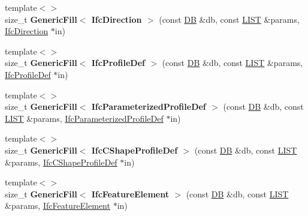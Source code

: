 \begin{DoxyCompactItemize}
\item 
\hypertarget{namespace_assimp_1_1_s_t_e_p_ac7d763d0df1d81a1e0e5924d529594d3}{{\footnotesize template$<$$>$ }\\size\+\_\+t {\bfseries Generic\+Fill$<$ Ifc\+Direction $>$} (const \hyperlink{class_assimp_1_1_s_t_e_p_1_1_d_b}{D\+B} \&db, const \hyperlink{class_assimp_1_1_s_t_e_p_1_1_e_x_p_r_e_s_s_1_1_l_i_s_t}{L\+I\+S\+T} \&params, \hyperlink{struct_assimp_1_1_i_f_c_1_1_ifc_direction}{Ifc\+Direction} $\ast$in)}\label{namespace_assimp_1_1_s_t_e_p_ac7d763d0df1d81a1e0e5924d529594d3}

\item 
\hypertarget{namespace_assimp_1_1_s_t_e_p_a959b997d69c3b7f9bb83d1ddb2758408}{{\footnotesize template$<$$>$ }\\size\+\_\+t {\bfseries Generic\+Fill$<$ Ifc\+Profile\+Def $>$} (const \hyperlink{class_assimp_1_1_s_t_e_p_1_1_d_b}{D\+B} \&db, const \hyperlink{class_assimp_1_1_s_t_e_p_1_1_e_x_p_r_e_s_s_1_1_l_i_s_t}{L\+I\+S\+T} \&params, \hyperlink{struct_assimp_1_1_i_f_c_1_1_ifc_profile_def}{Ifc\+Profile\+Def} $\ast$in)}\label{namespace_assimp_1_1_s_t_e_p_a959b997d69c3b7f9bb83d1ddb2758408}

\item 
\hypertarget{namespace_assimp_1_1_s_t_e_p_a700b26dffe9dd60914be9864e472335a}{{\footnotesize template$<$$>$ }\\size\+\_\+t {\bfseries Generic\+Fill$<$ Ifc\+Parameterized\+Profile\+Def $>$} (const \hyperlink{class_assimp_1_1_s_t_e_p_1_1_d_b}{D\+B} \&db, const \hyperlink{class_assimp_1_1_s_t_e_p_1_1_e_x_p_r_e_s_s_1_1_l_i_s_t}{L\+I\+S\+T} \&params, \hyperlink{struct_assimp_1_1_i_f_c_1_1_ifc_parameterized_profile_def}{Ifc\+Parameterized\+Profile\+Def} $\ast$in)}\label{namespace_assimp_1_1_s_t_e_p_a700b26dffe9dd60914be9864e472335a}

\item 
\hypertarget{namespace_assimp_1_1_s_t_e_p_aa828af5a89b67602cc595c36e4d0a0e8}{{\footnotesize template$<$$>$ }\\size\+\_\+t {\bfseries Generic\+Fill$<$ Ifc\+C\+Shape\+Profile\+Def $>$} (const \hyperlink{class_assimp_1_1_s_t_e_p_1_1_d_b}{D\+B} \&db, const \hyperlink{class_assimp_1_1_s_t_e_p_1_1_e_x_p_r_e_s_s_1_1_l_i_s_t}{L\+I\+S\+T} \&params, \hyperlink{struct_assimp_1_1_i_f_c_1_1_ifc_c_shape_profile_def}{Ifc\+C\+Shape\+Profile\+Def} $\ast$in)}\label{namespace_assimp_1_1_s_t_e_p_aa828af5a89b67602cc595c36e4d0a0e8}

\item 
\hypertarget{namespace_assimp_1_1_s_t_e_p_aa071b10293aa5fa789e119696cdfeaaf}{{\footnotesize template$<$$>$ }\\size\+\_\+t {\bfseries Generic\+Fill$<$ Ifc\+Feature\+Element $>$} (const \hyperlink{class_assimp_1_1_s_t_e_p_1_1_d_b}{D\+B} \&db, const \hyperlink{class_assimp_1_1_s_t_e_p_1_1_e_x_p_r_e_s_s_1_1_l_i_s_t}{L\+I\+S\+T} \&params, \hyperlink{struct_assimp_1_1_i_f_c_1_1_ifc_feature_element}{Ifc\+Feature\+Element} $\ast$in)}\label{namespace_assimp_1_1_s_t_e_p_aa071b10293aa5fa789e119696cdfeaaf}


\end{DoxyCompactItemize}
